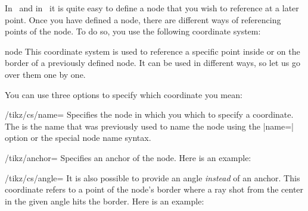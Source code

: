 In \pgfname\ and in \tikzname\ it is quite easy to define a node that you
wish to reference at a later point. Once you have defined a node,
there are different ways of referencing points of the node. To do so,
you use the following coordinate system:

\begin{coordinatesystem}{node}
  This coordinate system is used to reference a specific point inside
  or on the border of a previously defined node. It can be used in
  different ways, so let us go over them one by one.

  You can use three options to specify which coordinate you mean:
  \begin{key}{/tikz/cs/name=}
    Specifies the node in which you which to specify a coordinate. The
     is
    the name that was previously used to name the node using the
    |name=| option or the special node name syntax.
  \end{key}
  \begin{key}{/tikz/anchor=}
    Specifies an anchor of the node. Here is an example:
\begin{codeexample}[]
\end{codeexample}
  \end{key}
  \begin{key}{/tikz/cs/angle=}
    It is also possible to provide an angle \emph{instead} of an
    anchor. This coordinate refers to a point of the node's
    border where a ray shot from the center
    in the given angle hits the border. Here is an example:
\begin{codeexample}[]
\end{codeexample}
  \end{key}


\end{coordinatesystem}

